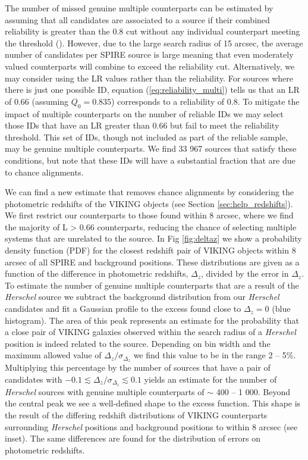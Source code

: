 \documentclass[fleqn,usenatbib]{mnras}
\begin{document}
The number of missed genuine multiple counterparts can be estimated by assuming that all candidates are associated to a source if their combined reliability is greater than the 0.8 cut without any individual counterpart meeting the threshold (\citealt{Fleuren_2012}). However, due to the large search radius of 15 arcsec, the average number of candidates per SPIRE source is large meaning that even moderately valued counterparts will combine to exceed the reliability cut. Alternatively, we may consider using the LR values rather than the reliability. For sources where there is just one possible ID, equation (\ref{eq:reliability_multi}) tells us that an LR of 0.66 (assuming $Q_0 = 0.835$) corresponds to a reliability of 0.8. To mitigate the impact of multiple counterparts on the number of reliable IDs we may select those IDs that have an LR greater than 0.66 but fail to meet the reliability threshold. This set of IDs, though not included as part of the reliable sample, may be genuine multiple counterparts. We find 33 967 sources that satisfy these conditions, but note that these IDs will have a substantial fraction that are due to chance alignments. 

We can find a new estimate that removes chance alignments by considering the photometric redshifts of the VIKING objects (see Section \ref{sec:help_redshifts}). We first restrict our counterparts to those found within 8 arcsec, where we find the majority of L > 0.66 counterparts, reducing the chance of selecting multiple systems that are unrelated to the source. In Fig \ref{fig:deltaz} we show a probability density function (PDF) for the closest redshift pair of VIKING objects within 8 arcsec of all SPIRE and background positions. These distributions are given as a function of the difference in photometric redshifts, $\Delta_z$, divided by the error in $\Delta_z$. To estimate the number of genuine multiple counterparts that are a result of the \textit{Herschel} source we subtract the background distribution from our \textit{Herschel} candidates and fit a Gaussian profile to the excess found close to $\Delta_z = 0$ (blue histogram). The area of this peak represents an estimate for the probability that a close pair of VIKING galaxies observed within the search radius of a \textit{Herschel} position is indeed related to the source. Depending on bin width and the maximum allowed value of $\Delta_z/\sigma_{\Delta_z}$ we find this value to be in the range 2 -- 5\%. Multiplying this percentage by the number of sources that have a pair of candidates with $-0.1 \lesssim \Delta_z/\sigma_{\Delta_z} \lesssim 0.1$ yields an estimate for the number of \textit{Herschel} sources with genuine multiple counterparts of $\sim$ 400 -- 1 000. Beyond the central peak we see a well-defined shape to the excess function. This shape is the result of the differing redshift distributions of VIKING counterparts surrounding \textit{Herschel} positions and background positions to within 8 arcsec (see inset). The same differences are found for the distribution of errors on photometric redshifts.
\end{document}
